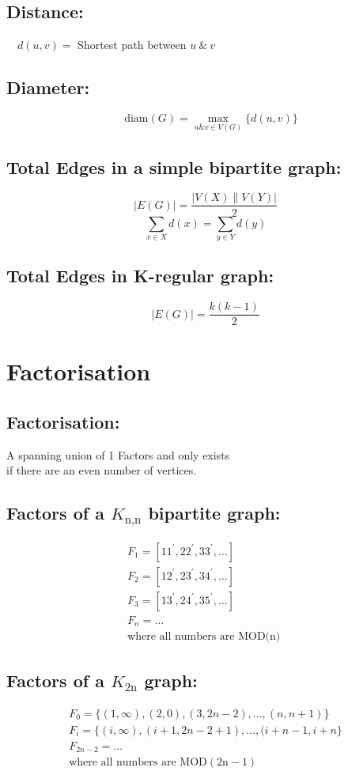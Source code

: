 \documentclass[../../mathematics_cheat_sheet.tex]{subfiles}
\begin{document}
\subsection{Distance:}
\begin{center}
$\quad d(u, v)=$ Shortest path between $u ~\&~ v$
\end{center}
%
\subsection{Diameter:}
\[\quad \text{diam}(G)=\max _{u \& v \in V(G)}\{d(u, v)\}\]
%
\subsection{Total Edges in a simple bipartite graph:}
\[|E(G)|=\frac{|V(X) \| V(Y)|}{2} \]
\[\sum_{x \in X} d(x)=\sum_{y \in Y} d(y)\]
%
\subsection{Total Edges in K-regular graph:}
\[|E(G)|=\frac{k(k-1)}{2}\]
%
\section{Factorisation}
%
\subsection{Factorisation:}
\begin{center}
A spanning union of 1 Factors and only exists\\ if there are an even number of vertices.
\end{center}
%
\subsection{Factors of a $K_\text{n,n}$ bipartite graph:}
\[
\begin{array}{l}
F_{1}=\left[11^{\prime}, 22^{\prime}, 33^{\prime}, \ldots\right]\\
F_{2}=\left[12^{\prime}, 23^{\prime}, 34^{\prime}, \ldots\right]\\
F_{3}=\left[13^{\prime}, 24^{\prime}, 35^{\prime}, \ldots\right]\\
F_{n}=\ldots\\
\text{where all numbers are MOD(n) }
\end{array}
\]
%
\subsection{Factors of a $K_\text{2n}$ graph:}
\[
\begin{array}{l}
F_{0}=\{(1, \infty),(2,0),(3,2 n-2), \ldots,(n, n+1)\}\\
F_{i}=\{(i, \infty),(i+1,2 n-2+1), \ldots,(i+n-1, i+n\}\\
F_{2 n-2}=\ldots\\
\text{where all numbers are } \mathrm{MOD}(2 \mathrm{n}-1)
\end{array}
\]
%
%
\end{document}
